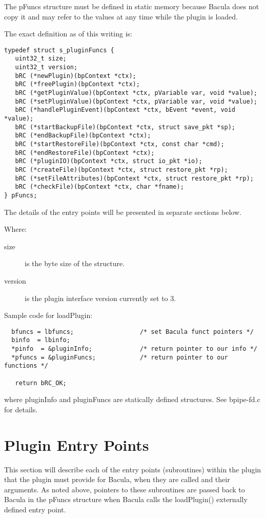 \begin{description}
The pFuncs structure must be defined in static memory because Bacula does not
copy it and may refer to the values at any time while the plugin is
loaded.

The exact definition as of this writing is:

\begin{verbatim}
typedef struct s_pluginFuncs {
   uint32_t size;
   uint32_t version;
   bRC (*newPlugin)(bpContext *ctx);
   bRC (*freePlugin)(bpContext *ctx);
   bRC (*getPluginValue)(bpContext *ctx, pVariable var, void *value);
   bRC (*setPluginValue)(bpContext *ctx, pVariable var, void *value);
   bRC (*handlePluginEvent)(bpContext *ctx, bEvent *event, void *value);
   bRC (*startBackupFile)(bpContext *ctx, struct save_pkt *sp);
   bRC (*endBackupFile)(bpContext *ctx);
   bRC (*startRestoreFile)(bpContext *ctx, const char *cmd);
   bRC (*endRestoreFile)(bpContext *ctx);
   bRC (*pluginIO)(bpContext *ctx, struct io_pkt *io);
   bRC (*createFile)(bpContext *ctx, struct restore_pkt *rp);
   bRC (*setFileAttributes)(bpContext *ctx, struct restore_pkt *rp);
   bRC (*checkFile)(bpContext *ctx, char *fname);
} pFuncs;
\end{verbatim}

The details of the entry points will be presented in
separate sections below. 

Where:
 \begin{description}
 \item [size] is the byte size of the structure.
 \item [version] is the plugin interface version currently set to 3.
 \end{description}

Sample code for loadPlugin:
\begin{verbatim}
  bfuncs = lbfuncs;                  /* set Bacula funct pointers */
  binfo  = lbinfo;
  *pinfo  = &pluginInfo;             /* return pointer to our info */
  *pfuncs = &pluginFuncs;            /* return pointer to our functions */

   return bRC_OK;
\end{verbatim}

where pluginInfo and pluginFuncs are statically defined structures. 
See bpipe-fd.c for details.



\end{description}

\section{Plugin Entry Points}
This section will describe each of the entry points (subroutines) within
the plugin that the plugin must provide for Bacula, when they are called
and their arguments. As noted above, pointers to these subroutines are
passed back to Bacula in the pFuncs structure when Bacula calls the 
loadPlugin() externally defined entry point.

